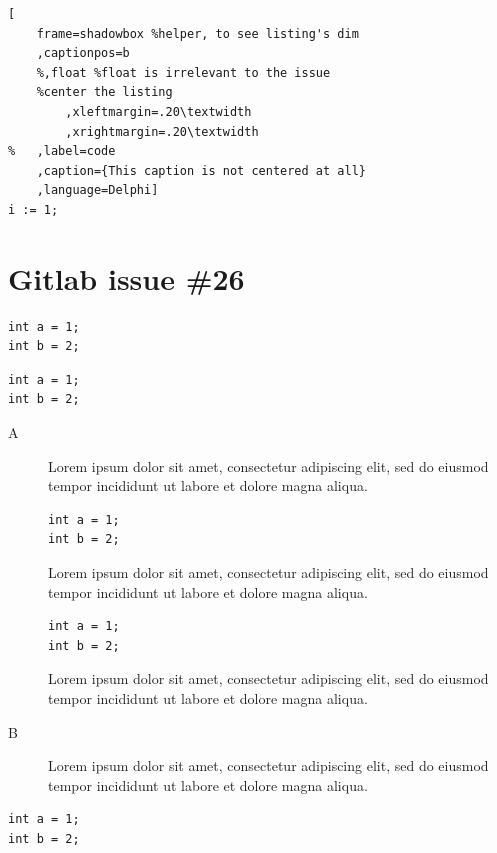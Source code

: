 \documentclass[a4paper,11pt]{article}
\makeatletter
\let\@makecaption@ORI\@makecaption
\let\lst@MakeCaption@ORI\lst@MakeCaption
\let\@makecaption@CAPTION\@makecaption
\let\lst@MakeCaption@CAPTION\lst@MakeCaption}
\newcommand\Original{\let\@makecaption\@makecaption@ORI\let\lst@MakeCaption\lst@MakeCaption@ORI}
\newcommand\Caption{\let\@makecaption\@makecaption@CAPTION\let\lst@MakeCaption\lst@MakeCaption@CAPTION}
\makeatother
\begin{document}
\captionsetup{box=colorbox,boxcolor=orange!20}

\begin{lstlisting}[
	frame=shadowbox %helper, to see listing's dim
	,captionpos=b
	%,float %float is irrelevant to the issue
	%center the listing
		,xleftmargin=.20\textwidth
		,xrightmargin=.20\textwidth
%	,label=code
	,caption={This caption is not centered at all}
	,language=Delphi]
i := 1;
\end{lstlisting}

\clearpage
\section*{Gitlab issue \#26}

\lstset{frame=single}

\Original

\begin{lstlisting}[caption={Hello World!}]
int a = 1;
int b = 2;
\end{lstlisting}

\begin{lstlisting}[caption={Hello World!},captionpos=b]
int a = 1;
int b = 2;
\end{lstlisting}

\begin{description}
\item[A]
Lorem ipsum dolor sit amet, consectetur adipiscing elit, sed do eiusmod tempor incididunt ut labore et dolore magna aliqua.
\begin{lstlisting}[caption={Hello World!}]
int a = 1;
int b = 2;
\end{lstlisting}
Lorem ipsum dolor sit amet, consectetur adipiscing elit, sed do eiusmod tempor incididunt ut labore et dolore magna aliqua.
\begin{lstlisting}[caption={Hello World!},captionpos=b]
int a = 1;
int b = 2;
\end{lstlisting}
Lorem ipsum dolor sit amet, consectetur adipiscing elit, sed do eiusmod tempor incididunt ut labore et dolore magna aliqua.
\item[B]
Lorem ipsum dolor sit amet, consectetur adipiscing elit, sed do eiusmod tempor incididunt ut labore et dolore magna aliqua.
\end{description}

\clearpage
\Caption\captionsetup{box=none}

\begin{lstlisting}[caption={Hello World!}]
int a = 1;
int b = 2;
\end{lstlisting}
\end{document}
